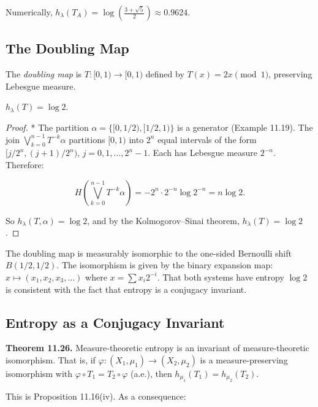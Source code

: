 Numerically, $h_\lambda(T_A) = \log\!\left(\frac{3+\sqrt{5}}{2}\right) \approx 0.9624$.

\subsection{The Doubling Map}\label{sec:11.6.4}

The \textit{doubling map} is $T \colon [0,1) \to [0,1)$ defined by $T(x) = 2x \pmod{1}$, preserving Lebesgue measure.

\begin{proposition}\label{prop:11.24.}
$h_\lambda(T) = \log 2$.
\end{proposition}


\begin{proof}
* The partition $\alpha = \{[0, 1/2), [1/2, 1)\}$ is a generator (Example 11.19). The join $\bigvee_{k=0}^{n-1} T^{-k}\alpha$ partitions $[0,1)$ into $2^n$ equal intervals of the form $[j/2^n, (j+1)/2^n)$, $j = 0, 1, \ldots, 2^n - 1$. Each has Lebesgue measure $2^{-n}$. Therefore:

\[
H\!\left(\bigvee_{k=0}^{n-1} T^{-k}\alpha\right) = -2^n \cdot 2^{-n} \log 2^{-n} = n \log 2.
\]

So $h_\lambda(T, \alpha) = \log 2$, and by the Kolmogorov--Sinai theorem, $h_\lambda(T) = \log 2$.
\end{proof}


\begin{remark}
The doubling map is measurably isomorphic to the one-sided Bernoulli shift $B(1/2, 1/2)$. The isomorphism is given by the binary expansion map: $x \mapsto (x_1, x_2, x_3, \ldots)$ where $x = \sum x_i 2^{-i}$. That both systems have entropy $\log 2$ is consistent with the fact that entropy is a conjugacy invariant.
\end{remark}


\subsection{Entropy as a Conjugacy Invariant}\label{sec:11.6.5}

\textbf{Theorem 11.26.} Measure-theoretic entropy is an invariant of measure-theoretic isomorphism. That is, if $\varphi \colon (X_1, \mu_1) \to (X_2, \mu_2)$ is a measure-preserving isomorphism with $\varphi \circ T_1 = T_2 \circ \varphi$ (a.e.), then $h_{\mu_1}(T_1) = h_{\mu_2}(T_2)$.

This is Proposition 11.16(iv). As a consequence:

